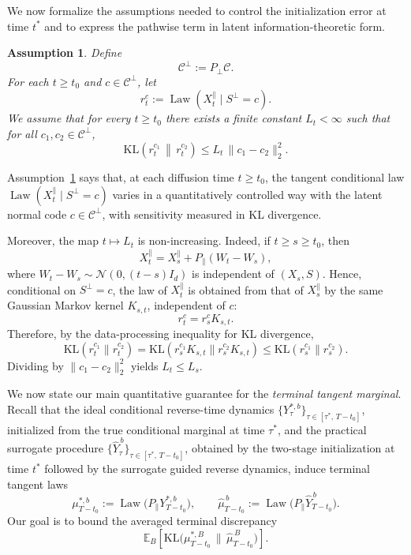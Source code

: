 \documentclass[twoside,11pt]{article}
\newcommand{\E}{\mathbb{E}}
\newcommand{\Nc}{\mathcal{N}}
\newcommand{\Cc}{\mathcal{C}}
\newcommand{\KL}{\mathrm{KL}}
\newcommand{\Law}{\operatorname{Law}}
\numberwithin{equation}{section}
\newtheorem{assumption}{Assumption}[section]
\begin{document}
We now formalize the assumptions needed to control the initialization error at time \(t^*\)
and to express the pathwise term in latent information-theoretic form.


\begin{assumption}
\label{ass:quad_log_t0_kernel}
Define
\[
\Cc^\perp := P_\perp \Cc .
\]
For each \(t\ge t_0\) and \(c\in\Cc^\perp\), let
\[
r_t^c := \Law(X_t^\parallel \mid S^\perp  = c).
\]
We assume that for every \(t\ge t_0\) there exists a finite constant \(L_t<\infty\) such that
for all \(c_1,c_2\in\Cc^\perp\),
\begin{equation}
\label{eq:quad_log_t0_kernel}
\KL\!\left(r_t^{c_1}\,\middle\|\,r_t^{c_2}\right)
\le
L_t\,\|c_1-c_2\|_2^2 .
\end{equation}
\end{assumption}

\begin{remark}
Assumption~\ref{ass:quad_log_t0_kernel} says that, at each diffusion time \(t\ge t_0\),
the tangent conditional law \(\Law(X_t^\parallel\mid S^\perp=c)\) varies in a quantitatively
controlled way with the latent normal code \(c\in\Cc^\perp\), with sensitivity measured in
KL divergence.

Moreover, the map \(t\mapsto L_t\) is non-increasing. Indeed, if \(t\ge s\ge t_0\), then
\[
X_t^\parallel = X_s^\parallel + P_\parallel(W_t-W_s),
\]
where \(W_t-W_s\sim\Nc(0,(t-s)I_d)\) is independent of \((X_s,S)\). Hence, conditional on
\(S^\perp=c\), the law of \(X_t^\parallel\) is obtained from that of \(X_s^\parallel\) by the
same Gaussian Markov kernel \(K_{s,t}\), independent of \(c\):
\[
r_t^c = r_s^c K_{s,t}.
\]
Therefore, by the data-processing inequality for KL divergence,
\[
\KL(r_t^{c_1}\|r_t^{c_2})
=
\KL(r_s^{c_1}K_{s,t}\|r_s^{c_2}K_{s,t})
\le
\KL(r_s^{c_1}\|r_s^{c_2}).
\]
Dividing by \(\|c_1-c_2\|_2^2\) yields \(L_t\le L_s\).
\end{remark}

\medskip

We now state our main quantitative guarantee for the \emph{terminal tangent marginal}.
Recall that the ideal conditional reverse-time dynamics
\(\{Y_\tau^{*,b}\}_{\tau\in[\tau^*,\,T-t_0]}\), initialized from the true conditional marginal
at time \(\tau^*\), and the practical surrogate procedure
\(\{\hat Y_\tau^{\,b}\}_{\tau\in[\tau^*,\,T-t_0]}\), obtained by the two-stage initialization
at time \(t^*\) followed by the surrogate guided reverse dynamics, induce terminal tangent laws
\[
\mu_{T-t_0}^{*,b}
:= \Law\!\big(P_\parallel Y_{T-t_0}^{*,b}\big),
\qquad
\hat\mu_{T-t_0}^{\,b}
:= \Law\!\big(P_\parallel \hat Y_{T-t_0}^{\,b}\big).
\]
Our goal is to bound the averaged terminal discrepancy
\[
\E_B\!\left[\KL\!\big(\mu_{T-t_0}^{*,B}\,\big\|\,\hat\mu_{T-t_0}^{\,B}\big)\right].
\]
\end{document}
